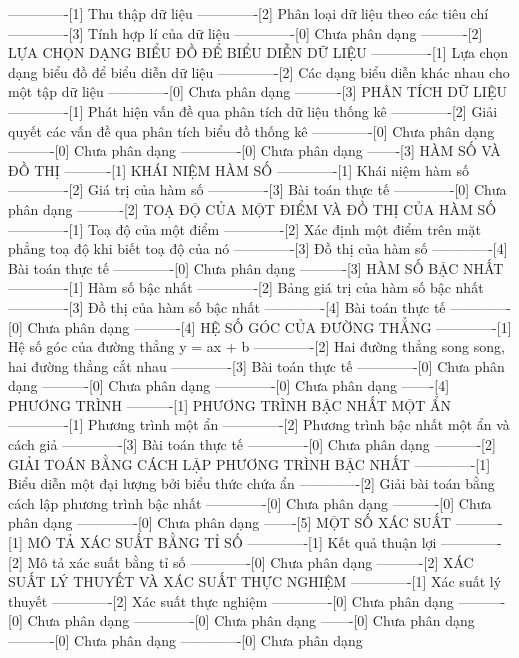 -------------[1] Thu thập dữ liệu
-------------[2] Phân loại dữ liệu theo các tiêu chí
-------------[3] Tính hợp lí của dữ liệu
-------------[0] Chưa phân dạng
----------[2] LỰA CHỌN DẠNG BIỂU ĐỒ ĐỂ BIỂU DIỄN DỮ LIỆU
-------------[1] Lựa chọn dạng biểu đồ để biểu diễn dữ liệu
-------------[2] Các dạng biểu diễn khác nhau cho một tập dữ liệu
-------------[0] Chưa phân dạng
----------[3] PHÂN TÍCH DỮ LIỆU
-------------[1] Phát hiện vấn đề qua phân tích dữ liệu thống kê
-------------[2] Giải quyết các vấn đề qua phân tích biểu đồ thống kê
-------------[0] Chưa phân dạng
----------[0] Chưa phân dạng
-------------[0] Chưa phân dạng
-------[3] HÀM SỐ VÀ ĐỒ THỊ
----------[1] KHÁI NIỆM HÀM SỐ
-------------[1] Khái niệm hàm số
-------------[2] Giá trị của hàm số
-------------[3] Bài toán thực tế
-------------[0] Chưa phân dạng
----------[2] TOẠ ĐỘ CỦA MỘT ĐIỂM VÀ ĐỒ THỊ CỦA HÀM SỐ
-------------[1] Toạ độ của một điểm
-------------[2] Xác định một điểm trên mặt phẳng toạ độ khi biết toạ độ của nó
-------------[3] Đồ thị của hàm số
-------------[4] Bài toán thực tế
-------------[0] Chưa phân dạng
----------[3] HÀM SỐ BẬC NHẤT
-------------[1] Hàm số bậc nhất
-------------[2] Bảng giá trị của hàm số bậc nhất
-------------[3] Đồ thị của hàm số bậc nhất
-------------[4] Bài toán thực tế
-------------[0] Chưa phân dạng
----------[4] HỆ SỐ GÓC CỦA ĐƯỜNG THẲNG
-------------[1] Hệ số góc của đường thẳng y = ax + b
-------------[2] Hai đường thẳng song song, hai đường thẳng cắt nhau
-------------[3] Bài toán thực tế
-------------[0] Chưa phân dạng
----------[0] Chưa phân dạng
-------------[0] Chưa phân dạng
-------[4] PHƯƠNG TRÌNH
----------[1] PHƯƠNG TRÌNH BẬC NHẤT MỘT ẨN
-------------[1] Phương trình một ẩn
-------------[2] Phương trình bậc nhất một ẩn và cách giả
-------------[3] Bài toán thực tế
-------------[0] Chưa phân dạng
----------[2] GIẢI TOÁN BẰNG CÁCH LẬP PHƯƠNG TRÌNH BẬC NHẤT
-------------[1] Biểu diễn một đại lượng bởi biểu thức chứa ẩn
-------------[2] Giải bài toán bằng cách lập phương trình bậc nhất
-------------[0] Chưa phân dạng
----------[0] Chưa phân dạng
-------------[0] Chưa phân dạng
-------[5] MỘT SỐ XÁC SUẤT
----------[1] MÔ TẢ XÁC SUẤT BẰNG TỈ SỐ
-------------[1] Kết quả thuận lợi
-------------[2] Mô tả xác suất bằng tỉ số
-------------[0] Chưa phân dạng
----------[2] XÁC SUẤT LÝ THUYẾT VÀ XÁC SUẤT THỰC NGHIỆM
-------------[1] Xác suất lý thuyết
-------------[2] Xác suất thực nghiệm
-------------[0] Chưa phân dạng
----------[0] Chưa phân dạng
-------------[0] Chưa phân dạng
-------[0] Chưa phân dạng
----------[0] Chưa phân dạng
-------------[0] Chưa phân dạng
